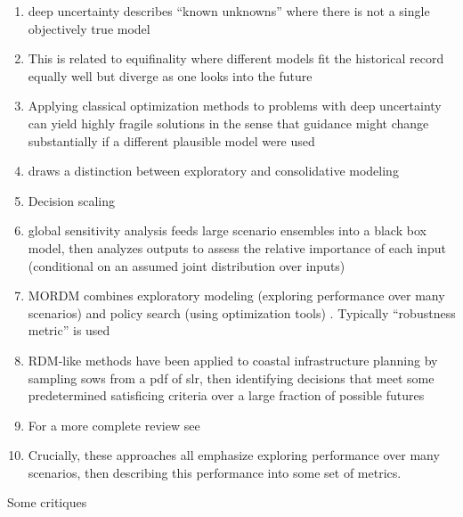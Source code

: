 \documentclass[11pt]{article}
\begin{document}
\begin{enumerate}
    \item deep uncertainty describes ``known unknowns'' where there is not a single objectively true model \citep{walker_deep:2013,Walker:2013gi,lempert_complex:2002}
    \item This is related to equifinality where different models fit the historical record equally well but diverge as one looks into the future \citep{beven_equifinality:2006,DossGollin:2019}
    \item Applying classical optimization methods to problems with deep uncertainty can yield highly fragile solutions in the sense that guidance might change substantially if a different plausible model were used
    \item \citet{bankes:1993} draws a distinction between exploratory and consolidative modeling
    \item Decision scaling \citep{Steinschneider:2015kk}
    \item global sensitivity analysis \citep{saltelli_sensitivity:2010,herman_salib:2017,sobol_sensitivity:2001} feeds large scenario ensembles into a black box model, then analyzes outputs to assess the relative importance of each input (conditional on an assumed joint distribution over inputs)
    \item MORDM \citep{kasprzyk:2013} combines exploratory modeling (exploring performance over many scenarios) and policy search (using optimization tools)  \citep{kasprzyk:2013,kasprzyk_denovo:2012,hadka_mordm:2015}. Typically ``robustness metric'' is used \citep{herman:2015,mcphail_robustness:2019}
    \item RDM-like methods have been applied to coastal infrastructure planning by sampling \glspl{sow} from a \gls{pdf} of \gls{slr}, then identifying decisions that meet some predetermined satisficing criteria \citep{mcphail_robustness:2019} over a large fraction of possible futures \citep{sriver_sealevel:2018,garner_slrise:2018,lempert_slr:2012}
    \item For a more complete review see \citet{marchau:2019}
    \item Crucially, these approaches all emphasize exploring performance over many scenarios, then describing this performance into some set of metrics.
\end{enumerate}
Some critiques
\end{document}
